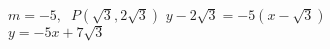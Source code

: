 {$m = -5, \;\; P(\sqrt{3}, 2\sqrt{3})$}
{$y - 2\sqrt{3} = -5(x - \sqrt{3})$ \\ $y = -5x + 7\sqrt{3}$ }